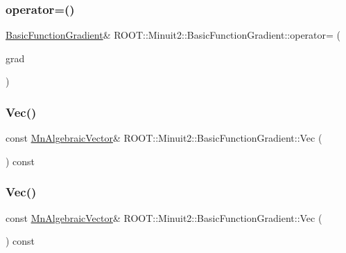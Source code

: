 \subsubsection{\texorpdfstring{operator=()}{operator=()}\hspace{0.1cm}{\footnotesize\ttfamily [3/3]}}
{\footnotesize\ttfamily \mbox{\hyperlink{classROOT_1_1Minuit2_1_1BasicFunctionGradient}{Basic\+Function\+Gradient}}\& R\+O\+O\+T\+::\+Minuit2\+::\+Basic\+Function\+Gradient\+::operator= (\begin{DoxyParamCaption}\item[{const \mbox{\hyperlink{classROOT_1_1Minuit2_1_1BasicFunctionGradient}{Basic\+Function\+Gradient}} \&}]{grad }\end{DoxyParamCaption})\hspace{0.3cm}{\ttfamily [inline]}}

\mbox{\label{classROOT_1_1Minuit2_1_1BasicFunctionGradient_a4c0d60175db412ac03313f824a055886}} 
\subsubsection{\texorpdfstring{Vec()}{Vec()}\hspace{0.1cm}{\footnotesize\ttfamily [1/3]}}
{\footnotesize\ttfamily const \mbox{\hyperlink{namespaceROOT_1_1Minuit2_a62ed97730a1ca8d3fbaec64a19aa11c9}{Mn\+Algebraic\+Vector}}\& R\+O\+O\+T\+::\+Minuit2\+::\+Basic\+Function\+Gradient\+::\+Vec (\begin{DoxyParamCaption}{ }\end{DoxyParamCaption}) const\hspace{0.3cm}{\ttfamily [inline]}}

\mbox{\label{classROOT_1_1Minuit2_1_1BasicFunctionGradient_a4c0d60175db412ac03313f824a055886}} 
\subsubsection{\texorpdfstring{Vec()}{Vec()}\hspace{0.1cm}{\footnotesize\ttfamily [2/3]}}
{\footnotesize\ttfamily const \mbox{\hyperlink{namespaceROOT_1_1Minuit2_a62ed97730a1ca8d3fbaec64a19aa11c9}{Mn\+Algebraic\+Vector}}\& R\+O\+O\+T\+::\+Minuit2\+::\+Basic\+Function\+Gradient\+::\+Vec (\begin{DoxyParamCaption}{ }\end{DoxyParamCaption}) const\hspace{0.3cm}{\ttfamily [inline]}}

